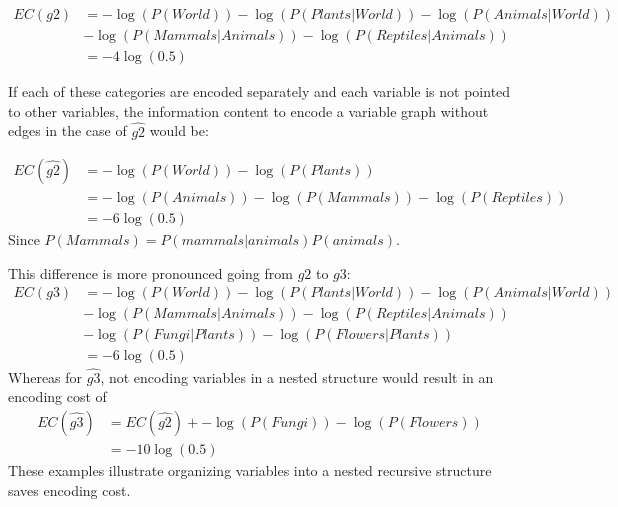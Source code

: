 \documentclass{article} %
\theoremstyle{remark}
\begin{document}
\begin{equation}
\begin{split}
EC(g2) & = -\log(P(World)) -\log(P(Plants|World))  -\log(P(Animals|World))  \\ 
&  - \log(P(Mammals|Animals)) - \log(P(Reptiles|Animals))  \\
&= -4\log(0.5)    
\end{split}
\end{equation}

If each of these categories are encoded separately and each variable is not pointed to other variables, the information content to encode a variable graph without edges in the case of $\hat{g2}$ would be:

\begin{equation}
\begin{split}
EC(\hat{g2}) & = -\log(P(World)) -\log(P(Plants)) \\
            & = -\log(P(Animals)) - \log(P(Mammals)) - \log(P(Reptiles)) \\
       & = -6\log(0.5)
\end{split}
\end{equation}
Since $P(Mammals) = P(mammals|animals)P(animals)$. 

This difference is more pronounced going from $g2$ to $g3$:
\begin{equation}
\begin{split}
EC(g3) & = -\log(P(World)) -\log(P(Plants|World))  -\log(P(Animals|World))  \\ 
&  - \log(P(Mammals|Animals)) - \log(P(Reptiles|Animals))  \\
&  - \log(P(Fungi|Plants)) - \log(P(Flowers|Plants)) \\
&  = -6\log(0.5)    
\end{split}
\end{equation}
Whereas for $\hat{g3}$, not encoding variables in a nested structure would result in an encoding cost of 
\begin{equation}
\begin{split}
EC(\hat{g3}) & = EC(\hat{g2}) +  - \log(P(Fungi)) - \log(P(Flowers))\\
       & = -10\log(0.5)
\end{split}
\end{equation}
These examples illustrate organizing variables into a nested recursive structure saves encoding cost.
\end{document}

